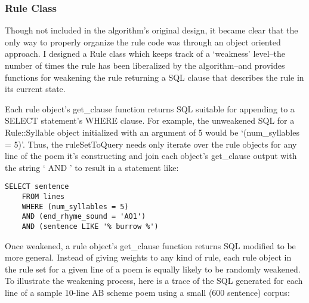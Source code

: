 \documentclass[10pt]{article}
\begin{document}
\subsubsection{Rule Class}
Though not included in the algorithm's original design, it became clear that
the only way to properly organize the rule code was through an object oriented
approach. I designed a Rule class which keeps track of a `weakness' level--the
number of times the rule has been liberalized by the algorithm--and provides
functions for weakening the rule returning a SQL clause that describes the rule
in its current state.

Each rule object's get\_clause function returns SQL suitable for appending to a
SELECT statement's WHERE clause. For example, the unweakened SQL for a
Rule::Syllable object initialized with an argument of 5 would be
`(num\_syllables = 5)'. Thus, the ruleSetToQuery needs only iterate over the
rule objects for any line of the poem it's constructing and join each object's
get\_clause output with the string ` AND ' to result in a statement like:

\begin{verbatim}
SELECT sentence 
    FROM lines 
    WHERE (num_syllables = 5) 
    AND (end_rhyme_sound = 'AO1') 
    AND (sentence LIKE '% burrow %')
\end{verbatim}

Once weakened, a rule object's get\_clause function returns SQL modified to be
more general. Instead of giving weights to any kind of rule, each rule object
in the rule set for a given line of a poem is equally likely to be randomly
weakened. To illustrate the weakening process, here is a trace of the SQL
generated for each line of a sample 10-line AB scheme poem using a small (600
sentence) corpus:
\end{document}
